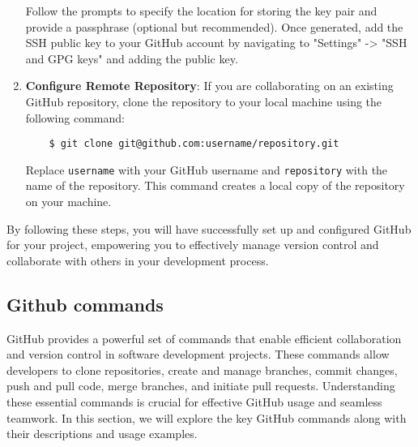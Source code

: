 \begin{enumerate}
    Follow the prompts to specify the location for storing the key pair and provide a passphrase (optional but recommended). Once generated, add the SSH public key to your GitHub account by navigating to "Settings" -> "SSH and GPG keys" and adding the public key.
    
    \item \textbf{Configure Remote Repository}: If you are collaborating on an existing GitHub repository, clone the repository to your local machine using the following command:
    
    \begin{verbatim}
    $ git clone git@github.com:username/repository.git
    \end{verbatim}
    
    Replace \texttt{username} with your GitHub username and \texttt{repository} with the name of the repository. This command creates a local copy of the repository on your machine.
\end{enumerate}

By following these steps, you will have successfully set up and configured GitHub for your project, empowering you to effectively manage version control and collaborate with others in your development process.

\subsection{Github commands}
GitHub provides a powerful set of commands that enable efficient collaboration and version control in software development projects. These commands allow developers to clone repositories, create and manage branches, commit changes, push and pull code, merge branches, and initiate pull requests. Understanding these essential commands is crucial for effective GitHub usage and seamless teamwork. In this section, we will explore the key GitHub commands along with their descriptions and usage examples.

